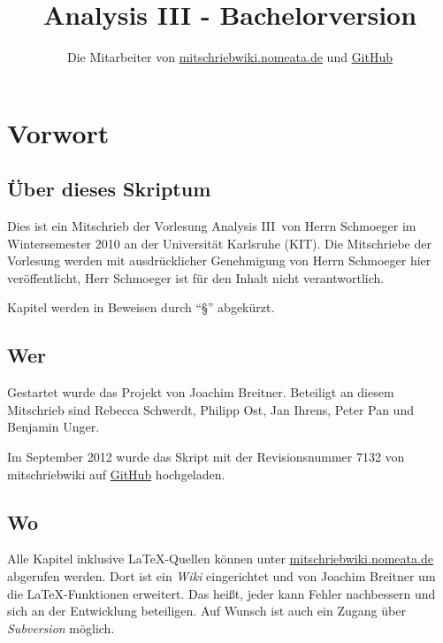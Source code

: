 \documentclass[a4paper,oneside,DIV15,BCOR12mm]{scrbook}
\author{Die Mitarbeiter von \href{http://mitschriebwiki.nomeata.de/}{mitschriebwiki.nomeata.de}
und \href{https://github.com/MartinThoma/LaTeX-examples/tree/master/documents}{GitHub}}
\title{Analysis III - Bachelorversion}
\begin{document}
\maketitle

\renewcommand{\thechapter}{\Roman{chapter}}
\tableofcontents

\chapter*{Vorwort}

\section*{Über dieses Skriptum}
Dies ist ein Mitschrieb der Vorlesung \glqq Analysis III\grqq\ von
Herrn Schmoeger im Wintersemester 2010 an der Universität Karlsruhe
(KIT). Die Mitschriebe der Vorlesung werden mit ausdrücklicher
Genehmigung von Herrn Schmoeger hier veröffentlicht, Herr Schmoeger
ist für den Inhalt nicht verantwortlich.

Kapitel werden in Beweisen durch "`§"' abgekürzt.

\section*{Wer}
Gestartet wurde das Projekt von Joachim Breitner. Beteiligt an diesem
Mitschrieb sind Rebecca Schwerdt, Philipp Ost, Jan Ihrens, Peter Pan
und Benjamin Unger.

Im September 2012 wurde das Skript mit der Revisionsnummer 7132 von
mitschriebwiki auf \href{https://github.com/MartinThoma/LaTeX-examples/blob/master/documents/Analysis%20III}{GitHub} hochgeladen.

\section*{Wo}
Alle Kapitel inklusive \LaTeX-Quellen können unter
\href{http://mitschriebwiki.nomeata.de}{mitschriebwiki.nomeata.de}
abgerufen werden.
Dort ist ein \emph{Wiki} eingerichtet und von Joachim Breitner um die
\LaTeX-Funktionen erweitert.
Das heißt, jeder kann Fehler nachbessern und sich an der Entwicklung
beteiligen. Auf Wunsch ist auch ein Zugang über \emph{Subversion}
möglich.
\end{document}

